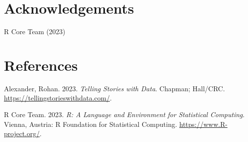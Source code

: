 \documentclass[
  letterpaper,
  DIV=11,
  numbers=noendperiod]{scrartcl}
\newlength{\cslhangindent}
\newenvironment{CSLReferences}[2] %
 {\begin{list}{}{%
  \setlength{\itemindent}{0pt}
  \setlength{\leftmargin}{0pt}
  \setlength{\parsep}{0pt}
  \ifodd #1
   \setlength{\leftmargin}{\cslhangindent}
   \setlength{\itemindent}{-1\cslhangindent}
  \fi
  \setlength{\itemsep}{#2\baselineskip}}}
 {\end{list}}
\begin{document}
\newpage

\section{Acknowledgements}\label{acknowledgements}

R Core Team (2023)

\section*{References}\label{references}

\label{refs}
\begin{CSLReferences}{1}{0}
Alexander, Rohan. 2023. \emph{Telling Stories with Data}. Chapman;
Hall/CRC. \url{https://tellingstorieswithdata.com/}.

R Core Team. 2023. \emph{{R: A Language and Environment for Statistical
Computing}}. Vienna, Austria: R Foundation for Statistical Computing.
\url{https://www.R-project.org/}.

\end{CSLReferences}
\end{document}
